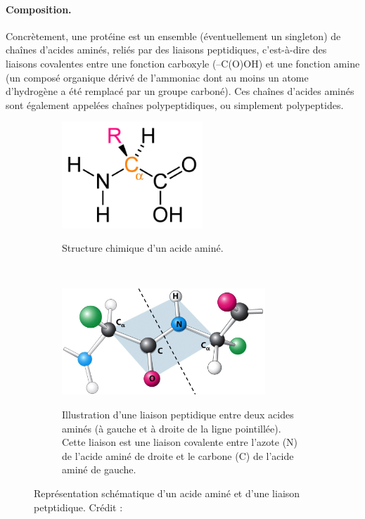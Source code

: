 	\paragraph{Composition.}
	Concrètement, une protéine est un ensemble (éventuellement un singleton) de chaînes d'acides aminés, reliés par des liaisons peptidiques, c'est-à-dire des liaisons covalentes entre une fonction carboxyle (–C(O)OH) et une fonction amine (un composé organique dérivé de l'ammoniac dont au moins un atome d'hydrogène a été remplacé par un groupe carboné). Ces chaînes d'acides aminés sont également appelées chaînes polypeptidiques, ou simplement polypeptides.
	
	\begin{figure}[H]
		\begin{subfigure}{.4\textwidth}
			\centering
			{\includegraphics[height=4cm]{./figures/ch1/amino_acid_structure}}
			\caption{Structure chimique d'un acide aminé.}
			\label{fig:amino_acid_structure}
		\end{subfigure}
		~
		\begin{subfigure}{.6\textwidth}
			\centering
			{\includegraphics[height=4cm]{./figures/ch1/peptidic_bond.png}}
			\caption{Illustration d'une liaison peptidique entre deux acides aminés (à gauche et à droite de la ligne pointillée). Cette liaison est une liaison covalente entre l'azote (N) de l'acide aminé de droite et le carbone (C) de l'acide aminé de gauche.}
			\label{fig:peptide_bond}
		\end{subfigure}
		\caption[Acide aminé.]{Représentation schématique d'un acide aminé et d'une liaison petptidique. Crédit :~\cite{berg_biochemistry_2012}}
		\label{fig:aminoAcid}
	\end{figure}
	
